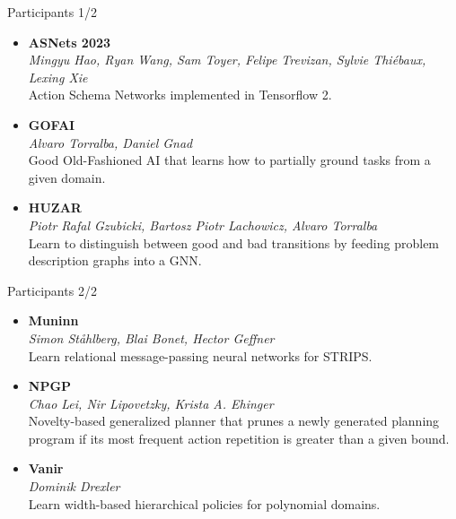 \documentclass[aspectratio=169,xcolor=dvipsnames]{beamer}
\begin{document}
\begin{frame}{Participants 1/2}
\begin{itemize}
\item
    \textbf{ASNets 2023}\\
    \emph{Mingyu Hao, Ryan Wang, Sam Toyer, Felipe Trevizan, Sylvie
    Thiébaux, Lexing Xie}\\
    Action Schema Networks implemented in Tensorflow 2.
\item
    \textbf{GOFAI}\\
    \emph{Alvaro Torralba, Daniel Gnad}\\
    Good Old-Fashioned AI that learns
    how to partially ground tasks from a given domain.
\item
    \textbf{HUZAR}\\
    \emph{Piotr Rafal Gzubicki, Bartosz Piotr Lachowicz, Alvaro Torralba}\\
    Learn to distinguish between good and bad transitions by feeding
    problem description graphs into a GNN.
\end{itemize}
\end{frame}

\begin{frame}{Participants 2/2}
\begin{itemize}
\item
    \textbf{Muninn}\\
    \emph{Simon Ståhlberg, Blai Bonet, Hector Geffner}\\
    Learn relational message-passing neural networks for STRIPS.
\item
    \textbf{NPGP}\\
    \emph{Chao Lei, Nir Lipovetzky, Krista A. Ehinger}\\
    Novelty-based generalized planner that
    prunes a newly generated planning program if its most frequent action
    repetition is greater than a given bound.
\item
    \textbf{Vanir}\\
    \emph{Dominik Drexler}\\
    Learn width-based hierarchical policies for
    polynomial domains.
\end{itemize}
\end{frame}
\end{document}
